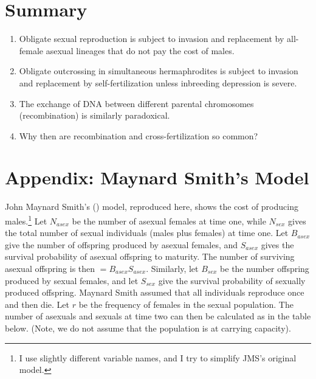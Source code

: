 \documentclass[
  letterpaper,
]{book}
\providecommand{\tightlist}{%
  \setlength{\itemsep}{0pt}\setlength{\parskip}{0pt}}\usepackage{longtable,booktabs,array}
\begin{document}
\section{Summary}\label{summary}

\begin{enumerate}
\def\labelenumi{\arabic{enumi}.}
\tightlist
\item
  Obligate sexual reproduction is subject to invasion and replacement by
  all-female asexual lineages that do not pay the cost of males.
\item
  Obligate outcrossing in simultaneous hermaphrodites is subject to
  invasion and replacement by self-fertilization unless inbreeding
  depression is severe.
\item
  The exchange of DNA between different parental chromosomes
  (recombination) is similarly paradoxical.
\item
  Why then are recombination and cross-fertilization so common?
\end{enumerate}

\section{Appendix: Maynard Smith's Model}\label{sec-app-1}

John Maynard Smith's () model,
reproduced here, shows the cost of producing males.\footnote{I use
  slightly different variable names, and I try to simplify JMS's
  original model.} Let \(N_{asex}\) be the number of asexual females at
time one, while \(N_{sex}\) gives the total number of sexual individuals
(males plus females) at time one. Let \(B_{asex}\) give the number of
offspring produced by asexual females, and \(S_{asex}\) gives the
survival probability of asexual offspring to maturity. The number of
surviving asexual offspring is then \(= B_{asex}S_{asex}\). Similarly,
let \(B_{sex}\) be the number offspring produced by sexual females, and
let \(S_{sex}\) give the survival probability of sexually produced
offspring. Maynard Smith assumed that all individuals reproduce once and
then die. Let \(r\) be the frequency of females in the sexual
population. The number of asexuals and sexuals at time two can then be
calculated as in the table below. (Note, we do not assume that the
population is at carrying capacity).
\end{document}
